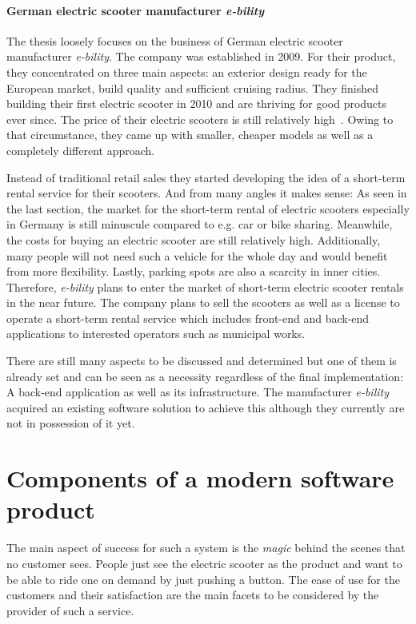 \documentclass[12pt,a4paper,twoside]{report}
\begin{document}
\paragraph{German electric scooter manufacturer \textit{e-bility}} \label{sect:e-bility}

The thesis loosely focuses on the business of German electric scooter manufacturer \textit{e-bility}.
The company was established in 2009. For their product, they concentrated on three main aspects:
an exterior design ready for the European market, build quality and sufficient cruising radius.
They finished building their first electric scooter in 2010 and are thriving for good products ever since.
The price of their electric scooters is still relatively high~\cite{e-bility}.
Owing to that circumstance, they came up with smaller, cheaper models
as well as a completely different approach.

Instead of traditional retail sales they started developing the idea of a
short-term rental service for their scooters. And from many angles it makes sense:
As seen in the last section, the market for the short-term rental of electric scooters
especially in Germany is still minuscule compared to e.g. car or bike sharing.
Meanwhile, the costs for buying an electric scooter are still relatively high.
Additionally, many people will not need such a vehicle for the whole day and would benefit
from more flexibility. Lastly, parking spots are also a scarcity in inner cities.
Therefore, \textit{e-bility} plans to enter the market of short-term electric scooter rentals
in the near future. The company plans to sell the scooters as well as a license
to operate a short-term rental service which includes front-end and back-end applications
to interested operators such as municipal works.

There are still many aspects to be discussed and determined but one of them
is already set and can be seen as a necessity regardless of the final implementation:
A back-end application as well as its infrastructure.
The manufacturer \textit{e-bility} acquired an existing software solution
to achieve this although they currently are not in possession of it yet.


\section{Components of a modern software product} \label{sect:frontend/backend}

The main aspect of success for such a system is the \textit{magic} behind the scenes
that no customer sees. People just see the electric scooter as the product and
want to be able to ride one on demand by just pushing a button.
The ease of use for the customers and their satisfaction are the main facets
to be considered by the provider of such a service.
\end{document}
